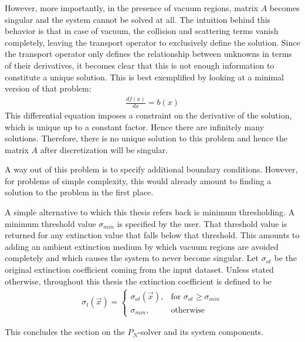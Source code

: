 However, more importantly, in the presence of vacuum regions, matrix $A$ becomes singular and the system cannot be solved at all. The intuition behind this behavior is that in case of vacuum, the collision and scattering terms vanish completely, leaving the transport operator to exclusively define the solution. Since the transport operator only defines the relationship between unknowns in terms of their derivatives, it becomes clear that this is not enough information to constitute a unique solution. This is best exemplified by looking at a minimal version of that problem:
\begin{align*}
\frac{df\left(x\right)}{dx} = b\left(x\right)
\end{align*}
This differential equation imposes a constraint on the derivative of the solution, which is unique up to a constant factor. Hence there are infinitely many solutions. Therefore, there is no unique solution to this problem and hence the matrix $A$ after discretization will be singular.

A way out of this problem is to specify additional boundary conditions. However, for problems of simple complexity, this would already amount to finding a solution to the problem in the first place.

A simple alternative to which this thesis refers back is minimum thresholding. A minimum threshold value $\sigma_{min}$ is specified by the user. That threshold value is returned for any extinction value that falls below that threshold. This amounts to adding an ambient extinction medium by which vacuum regions are avoided completely and which causes the system to never become singular. Let $\sigma_{ot}$ be the original extinction coefficient coming from the input dataset. Unless stated otherwise, throughout this thesis the extinction coefficient is defined to be
\begin{align}
\label{eq:pn_solver_minimum_threshold}
\sigma_t\left(\vec{x}\right) =
\begin{cases}
\sigma_{ot}\left(\vec{x}\right), & \text{for $\sigma_{ot}\ge\sigma_{min}$}
\\
\sigma_{min}, & \text{otherwise}
\end{cases}
\end{align}

This concludes the section on the $P_N$-solver and its system components.